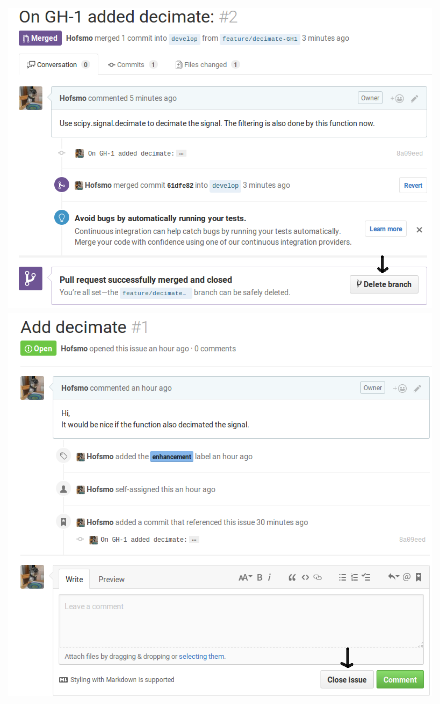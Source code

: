 \begin{frame}
\begin{columns}
\begin{column}{0.6\textwidth}
\begin{figure}
\begin{overprint}
					\includegraphics[width=\textwidth]{./pictures/delete_branch.png}
					\onslide<5>\includegraphics[width=\textwidth]{./pictures/close_issue.png}
				\end{overprint}
			\end{figure}
		\end{column}
	\end{columns}
\end{frame}

